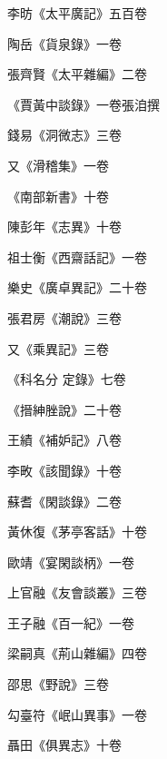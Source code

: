 \begin{pinyinscope}
 李昉《太平廣記》五百卷



 陶岳《貨泉錄》一卷



 張齊賢《太平雜編》二卷



 《賈黃中談錄》一卷張洎撰



 錢易《洞微志》三卷



 又《滑稽集》一卷



 《南部新書》十卷



 陳彭年《志異》十卷



 祖士衡《西齋話記》一卷



 樂史《廣卓異記》二十卷



 張君房《潮說》三卷



 又《乘異記》三卷



 《科名分
 定錄》七卷



 《搢紳脞說》二十卷



 王績《補妒記》八卷



 李畋《該聞錄》十卷



 蘇耆《閑談錄》二卷



 黃休復《茅亭客話》十卷



 歐靖《宴閑談柄》一卷



 上官融《友會談叢》三卷



 王子融《百一紀》一卷



 梁嗣真《荊山雜編》四卷



 邵思《野說》三卷



 勾臺符《岷山異事》一卷



 聶田《俱異志》十卷




\end{pinyinscope}
